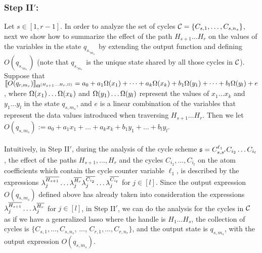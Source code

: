 \subsubsection{Step II$'$:}
Let $s\in [1,r-1]$. In order to analyze the set of cycles ${\mathcal{C} }=\{C_{s,1},\dots,C_{s,n_{s}}\}$, next we show how to summarize the effect of the path $H_{s+1}\dots H_r$ on the values of the variables in the state $q_{s,_{m_s}}$ by extending the output function and defining $O(q_{s,_{m_s}})$ (note that $q_{s,_{m_s}}$ is the unique state shared by all those cycles in ${\mathcal{C} }$).
Suppose that $\llbracket O(q_{r,m_r})\rrbracket_{\Theta^{(H_{s+1}\dots H_{r}, \Omega)}}=a_0+a_1 \Omega(x_1)+ \dots + a_k \Omega(x_k) + b_1 \Omega(y_1) + \dots + b_l \Omega(y_l)+e$, where $\Omega(x_1)\dots\Omega(x_k)$ and $\Omega(y_1)\ldots \Omega(y_l)$ represent the values of $x_1\dots x_k$ and $y_1 \dots y_l$ in the state $q_{s, m_{s}}$, and $e$ is a linear combination of the variables that represent the data values introduced when traversing $H_{s+1}\dots H_r$. 
Then we let
$O(q_{s, m_{s}}):=a_0+a_1 x_1 + \dots + a_k x_k + b_1 y_1 + \dots + b_l y_l$.
\bigskip\\
\medskip\\
Intuitively, in Step II$'$, during the analysis of the cycle scheme ${\mathfrak{s} } = C^{\ell_1}_{s,s'} C_{i_{2}} \dots C_{i_{t}}$, the effect of the paths $H_{s+1},  \dots,  H_r$ and the cycles $C_{i_{2}}, \dots, C_{i_{t}}$ on the atom coefficients which contain the cycle counter variable $\ell_1$, is described by the expressions  $\lambda^{\overline{H_{s+1}}}_j \dots \lambda^{\overline{H_{r}}}_j  \lambda^{\overline{C_{i_{2}}}}_j \dots \lambda^{\overline{C_{i_{t}}}}_j $ for $j \in [l]$. Since the output expression $O(q_{s, m_{s}})$ defined above has already taken into consideration the expressions $\lambda^{\overline{H_{s+1}}}_j \dots \lambda^{\overline{H_{r}}}_j$ for $j \in [l]$, in Step II$'$, we can do the analysis for the cycles in ${\mathcal{C} }$ as if we have a generalized lasso where the handle is $H_1\dots H_s$, the collection of cycles is $\{C_{s,1},\dots, C_{s,n_s}$, $\dots$, $C_{r,1},\dots, C_{r,n_r}\}$, and the output state is $q_{s,m_s}$, with the output expression  $O(q_{s, m_{s}})$.
